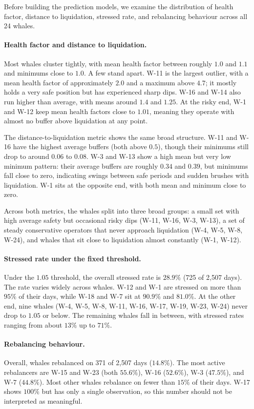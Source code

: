 Before building the prediction models, we examine the distribution of
health factor, distance to liquidation, stressed rate, and rebalancing
behaviour across all 24 whales.

\paragraph{Health factor and distance to liquidation.}
Most whales cluster tightly, with mean health factor between roughly
$1.0$ and $1.1$ and minimums close to $1.0$. A few stand apart.
W-11 is the largest outlier, with a mean health factor of approximately
$2.0$ and a maximum above $4.7$; it mostly holds a very safe position
but has experienced sharp dips. W-16 and W-14 also run higher than
average, with means around $1.4$ and $1.25$. At the risky end, W-1 and
W-12 keep mean health factors close to $1.01$, meaning they operate with
almost no buffer above liquidation at any point.

The distance-to-liquidation metric shows the same broad structure. W-11
and W-16 have the highest average buffers (both above $0.5$), though
their minimums still drop to around $0.06$ to $0.08$. W-3 and W-13
show a high mean but very low minimum pattern: their average buffers are
roughly $0.34$ and $0.39$, but minimums fall close to zero, indicating
swings between safe periods and sudden brushes with liquidation. W-1
sits at the opposite end, with both mean and minimum close to zero.

Across both metrics, the whales split into three broad groups: a small
set with high average safety but occasional risky dips (W-11, W-16, W-3,
W-13), a set of steady conservative operators that never approach
liquidation (W-4, W-5, W-8, W-24), and whales that sit close to
liquidation almost constantly (W-1, W-12).

\paragraph{Stressed rate under the fixed threshold.}
Under the $1.05$ threshold, the overall stressed rate is $28.9\%$
(725 of 2{,}507 days). The rate varies widely across whales. W-12 and
W-1 are stressed on more than $95\%$ of their days, while W-18 and W-7
sit at $90.9\%$ and $81.0\%$. At the other end, nine whales (W-4, W-5,
W-8, W-11, W-16, W-17, W-19, W-23, W-24) never drop to $1.05$ or below.
The remaining whales fall in between, with stressed rates ranging from
about $13\%$ up to $71\%$.

\paragraph{Rebalancing behaviour.}
Overall, whales rebalanced on 371 of 2{,}507 days ($14.8\%$). The most
active rebalancers are W-15 and W-23 (both $55.6\%$), W-16 ($52.6\%$),
W-3 ($47.5\%$), and W-7 ($44.8\%$). Most other whales rebalance on
fewer than $15\%$ of their days. W-17 shows $100\%$ but has only a
single observation, so this number should not be interpreted as
meaningful.

